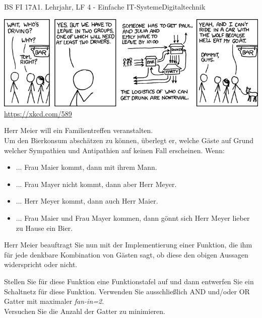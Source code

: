 \documentclass[oneside,openany,headings=optiontotoc,11pt,numbers=noenddot]{scrreprt}
\begin{document}
	\begin{worksheet}{BS FI 17A}{1. Lehrjahr, LF 4 - Einfache IT-Systeme}{Digitaltechnik}
		\begin{framed}
			\noindent
			\includegraphics[scale=0.62]{Bilder/logic_party.png}\\
			\tiny{\color{codegray}\url{https://xkcd.com/589}}
		\end{framed}
		\begin{framed}
			\noindent
			Herr Meier will ein Familientreffen veranstalten.\\
			Um den Bierkonsum abschätzen zu können, überlegt er, welche Gäste auf Grund welcher Sympathien und Antipathien auf keinen Fall erscheinen. Wenn:
			\begin{itemize}
				\item ... Frau Maier kommt, dann mit ihrem Mann.
				\item ... Frau Mayer nicht kommt, dann aber Herr Meyer.
				\item ... Herr Meyer kommt, dann auch Herr Maier.
				\item ... Frau Maier und Frau Mayer kommen, dann gönnt sich Herr Meyer lieber zu Hause ein Bier.
			\end{itemize}
		\par\bigskip\noindent
		Herr Meier beauftragt Sie nun mit der Implementierung einer Funktion, die ihm für jede denkbare Kombination von Gästen sagt, ob diese den obigen Aussagen widerspricht oder nicht.\par\bigskip\noindent
		Stellen Sie für diese Funktion eine Funktionstafel auf und dann entwerfen Sie ein Schaltnetz für diese Funktion. Verwenden Sie ausschließlich AND und/oder OR Gatter mit maximaler \textit{fan-in=2}.\\
		Versuchen Sie die Anzahl der Gatter zu minimieren.
		\end{framed}
	\end{worksheet}
\end{document}
